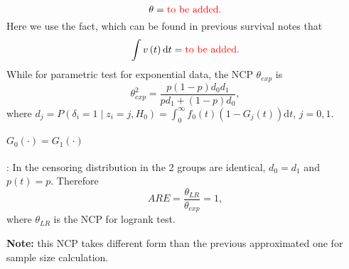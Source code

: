 \documentclass[a4paper,12pt]{article}
\begin{document}
\[
  \theta =
  {\color{red}\text{to be added.}}
\]
Here we use the fact, which can be found in {\color{red} previous survival notes} that
\[
  \int v\left(t\right)\mathrm{d}t =
  {\color{red}\text{to be added.}}
\]
While for parametric test for exponential data, the NCP $\theta_{exp}$ is
\[
  \theta^2_{exp}
  = \frac{
    p\left(1 - p\right)d_0d_1
  }{
    pd_1 + \left(1 - p\right)d_0
  }
  ,
\]
where $d_j = P\left(\delta_i = 1\middle|z_i = j, H_0\right) = \int_0^{\infty}f_0\left(t\right)\left(1 - G_j\left(t\right)\right)\mathrm{d}t$, $j = 0, 1$. 
\par

\paragraph{$G_0\left(\cdot\right) = G_1\left(\cdot\right)$}: In the censoring distribution in the 2 groups are identical, $d_0 = d_1$ and $p\left(t\right) = p$. Therefore
\[
  ARE = \frac{\theta_{LR}}{\theta_{exp}} = 1
  ,
\]
where $\theta_{LR}$ is the NCP for logrank test.
\par
\textbf{Note:} this NCP takes different form than the previous approximated one for sample size calculation.






\end{document}
